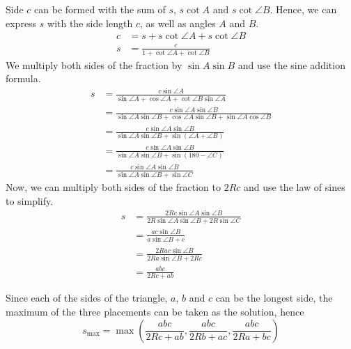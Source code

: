 \documentclass[12pt]{scrartcl}
\begin{document}
Side $c$ can be formed with the sum of $s$, $s \cot A$ and $s \cot \angle{B}$. Hence, we can express $s$ with the side length $c$, as well as angles $A$ and $B$.
\begin{align*}
	c & = s+s\cot \angle{A}+s\cot \angle{B}          \\
	s & = \frac{c}{1+\cot \angle{A}+\cot \angle{B}}                                                                            
\end{align*}
We multiply both sides of the fraction by $\sin A \sin B$ and use the sine addition formula.
\begin{align*}
	s & = \frac{c \sin\angle{A}}{\sin\angle{A}+\cos\angle{A}+\cot\angle{B}\sin\angle{A}}                                       \\
	  & = \frac{c\sin\angle{A}\sin\angle{B}}{\sin\angle{A}\sin\angle{B}+\cos\angle{A}\sin\angle{B}+\sin\angle{A}\cos\angle{B}} \\
	  & = \frac{c\sin\angle{A}\sin\angle{B}}{\sin\angle{A}\sin\angle{B}+\sin\left(\angle{A}+\angle{B}\right)}                  \\
	  & = \frac{c\sin\angle{A}\sin\angle{B}}{\sin\angle{A}\sin\angle{B}+\sin\left(180-\angle C\right)}                         \\
	  & = \frac{c\sin\angle{A}\sin\angle{B}}{\sin\angle{A}\sin\angle{B}+\sin \angle C}                                         
\end{align*}
Now, we can multiply both sides of the fraction to $2Rc$ and use the law of sines to simplify.
\begin{align*}
	 s & = \frac{2Rc\sin\angle{A}\sin\angle{B}}{2R\sin\angle{A}\sin \angle{B}+2R\sin \angle C}                                  \\
	  & = \frac{ac\sin\angle{B}}{a\sin\angle{B}+c}                                                                             \\
	  & = \frac{2Rac\sin\angle{B}}{2Ra\sin\angle{B}+2Rc}                                                                       \\
	  & = \frac{abc}{2Rc+ab}
\end{align*}

Since each of the sides of the triangle, $a$, $b$ and $c$ can be the longest side,
the maximum of the three placements can be taken as the solution, hence
\begin{equation}
	s_{\text{max}} = \max\left(\dfrac{abc}{2Rc+ab},\dfrac{abc}{2Rb+ac},\dfrac{abc}{2Ra+bc}\right)
\end{equation}
\end{document}
